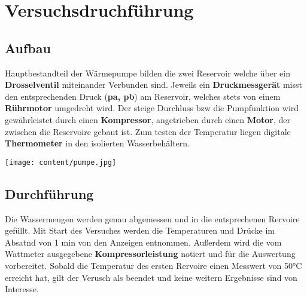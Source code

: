\section{Versuchsdruchführung}
\label{sec:Versuchsdruchführung}





\noindent\begin{minipage}{0.5\textwidth}
\subsection{Aufbau}
\label{sec:Aufbau}
Hauptbestandteil der Wärmepumpe bilden die zwei Reservoir welche über ein  \\
\textbf{Drosselventil} miteinander Verbunden sind. Jeweils ein \textbf{Druckmessgerät} misst 
den entsprechenden Druck (\textbf{pa, pb}) am Reservoir, welches stets von einem \textbf{Rührmotor} umgedreht wird.
Der steige Durchluss bzw die Pumpfunktion wird gewährleistet durch einen \textbf{Kompressor}, angetrieben durch einen \textbf{Motor}, %
 der zwischen die Reservoire gebaut ist. Zum testen der Temperatur liegen digitale 
\textbf{Thermometer} in den isolierten Wasserbehältern.
\end{minipage}
\hfill
\begin{minipage}{0.5\textwidth}\raggedleft
\vspace{2cm}
\texttt{[image: content/pumpe.jpg]}

\end{minipage}


\subsection{Durchführung}
\label{sec:Durchfuehrung}
Die Wassermengen werden genau abgemessen und in die entsprechenen Rervoire gefüllt. %
Mit Start des Versuches werden die Temperaturen und Drücke im Absatnd von 1 min von den Anzeigen entnommen. Außerdem wird die vom Wattmeter ausgegebene \textbf{Kompressorleistung} notiert und für 
die Auswertung vorbereitet. Sobald die Temperatur des ersten Rervoire einen Messwert von 50°C erreicht hat, gilt der Verusch als beendet und keine weitern Ergebnisse sind von Interesse.
